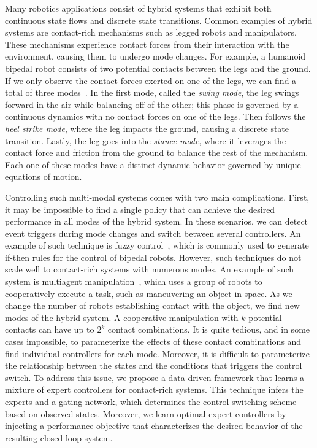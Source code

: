 

Many robotics applications consist of hybrid systems that exhibit both
continuous state flows and discrete state transitions. Common examples of hybrid
systems are contact-rich mechanisms such as legged robots and manipulators.
These mechanisms experience contact forces from their interaction with the
environment, causing them to undergo mode changes. 
%
For example, a humanoid bipedal robot consists of two potential contacts between
the legs and the ground.
%
If we only observe the contact forces exerted on one of the legs, we can find a
total of three modes~\cite{underactuated}.
%
In the first mode, called the \textit{swing mode}, the leg swings forward in the
air while balancing off of the other; this phase is governed by a continuous
dynamics with no contact forces on one of the legs. 
%
Then follows the \textit{heel strike mode}, where the leg impacts the ground,
causing a discrete state transition.
%
Lastly, the leg goes into the \textit{stance mode}, where it leverages the
contact force and friction from the ground to balance the rest of the mechanism.
%
Each one of these modes have a distinct dynamic behavior governed by unique
equations of motion.
%

Controlling such multi-modal systems comes with two main complications. First,
it may be impossible to find a single policy that can achieve the desired
performance in all modes of the hybrid system.
%
In these scenarios, we can detect event triggers during mode changes
and switch between several controllers.
%
An example of such technique is fuzzy control~\cite{kahraman2020fuzzy,
katic2003survey}, which is commonly used to generate if-then rules for the
control of bipedal robots. 
%
However, such techniques do not scale well to
contact-rich systems with numerous modes. 
%
An example of such system is multiagent
manipulation~\cite{ashenafi2021nonholonomic}, which uses a group of robots to
cooperatively execute a task, such as maneuvering an object in space. 
%
As we change the number of robots establishing contact with the object, we find
new modes of the hybrid system.
%
A cooperative manipulation with $k$ potential contacts can have up to $2^k$
contact combinations. 
%
It is quite tedious, and in some cases impossible, to parameterize
the effects of these contact combinations and find individual controllers for
each mode. Moreover, it is difficult to parameterize the relationship between
the states and the conditions that triggers the control switch.
%
To address this issue, we propose a data-driven framework that
learns a mixture of expert controllers for contact-rich systems.
%
This technique infers the experts and a gating network, which determines the
control switching scheme based on observed states.
%
Moreover, we learn optimal expert controllers by injecting a performance
objective that characterizes the desired behavior of the resulting closed-loop
system.


